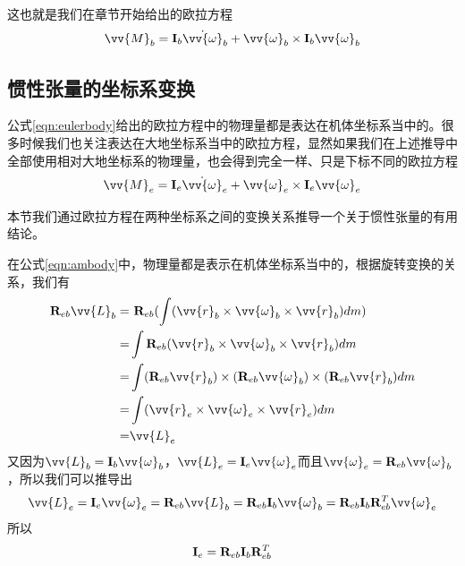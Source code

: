 \documentclass[11pt]{article}
\begin{document}
这也就是我们在章节开始给出的欧拉方程
\begin{equation}\label{eqn:eulerbody}
\vv{M}_b = {\bf I}_b\dot{\vv{\omega}}_b + \vv{\omega}_b \times {\bf I}_b\vv{\omega}_b
\end{equation}
\subsection{惯性张量的坐标系变换}\label{sec:tensortrans}
公式\ref{eqn:eulerbody}给出的欧拉方程中的物理量都是表达在机体坐标系当中的。很多时候我们也关注表达在大地坐标系当中的欧拉方程，显然如果我们在上述推导中全部使用相对大地坐标系的物理量，也会得到完全一样、只是下标不同的欧拉方程
\begin{equation}\label{eqn:eulerground}
\vv{M}_e = {\bf I}_e\dot{\vv{\omega}}_e + \vv{\omega}_e \times {\bf I}_e\vv{\omega}_e
\end{equation}

本节我们通过欧拉方程在两种坐标系之间的变换关系推导一个关于惯性张量的有用结论。

在公式\ref{eqn:ambody}中，物理量都是表示在机体坐标系当中的，根据旋转变换的关系，我们有
\begin{align*}
{\bf R}_{eb}\vv{L}_b = & \ {\bf R}_{eb} (\int (\vv{r}_b \times \vv{\omega}_b\times\vv{r}_b) dm)\\
= & \int {\bf R}_{eb}(\vv{r}_b \times \vv{\omega}_b\times\vv{r}_b) dm \\
= & \int ({\bf R}_{eb}\vv{r}_b) \times ({\bf R}_{eb}\vv{\omega}_b) \times ({\bf R}_{eb}\vv{r}_b) dm \\
= & \int (\vv{r}_e \times \vv{\omega}_e\times\vv{r}_e) dm \\
= & \vv{L}_e
\end{align*}
又因为$\vv{L}_b = {\bf I}_b\vv{\omega}_b$，$\vv{L}_e = {\bf I}_e\vv{\omega}_e$而且$\vv{{\omega}}_e = {\bf R}_{eb}\vv{\omega}_b$，所以我们可以推导出
$$
\vv{L}_e = {\bf I}_e\vv{\omega}_e = {\bf R}_{eb}\vv{L}_b = {\bf R}_{eb}{\bf I}_b\vv{\omega}_b = {\bf R}_{eb}{\bf I}_b{\bf R}^T_{eb}\vv{\omega}_e 
$$ 
所以
\begin{equation}\label{eqn:tensortrans}
{\bf I}_e = {\bf R}_{eb}{\bf I}_b{\bf R}^T_{eb}
\end{equation}

\end{document}
